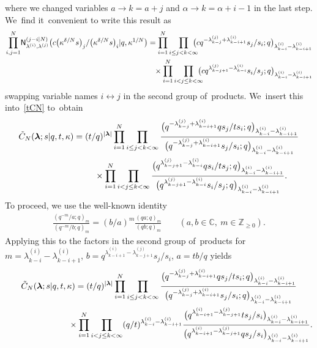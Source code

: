 \documentclass[pdftex]{sigma}%
\numberwithin{equation}{section}
\newcommand{\vlam}{\boldsymbol{\lambda}}
\newcommand{\C}{{\mathbb C}}
\newcommand{\Z}{{\mathbb Z}}
\begin{document}
where we changed variables $a\to k=a+j$ and $\alpha\to k=\alpha+i-1$ in the last step.
We~find it~convenient to write this result as
\begin{gather*}
\prod_{i,j=1}^N \! \mathsf{N}^{(j-i|N)}_{\lambda^{(i)},\lambda^{(j)}}\big(c\big(\kappa^{\delta/N} s\big)_j/\big(\kappa^{\delta/N} s\big)_i|q,\kappa^{1/N}\big)
= \prod_{i=1}^N \prod_{i\leq j<k<\infty} \!\!\!\!\!\big(c q^{-\lambda^{(j)}_{k-j}+\lambda^{(i)}_{k-i+1}}s_{j}/s_i;q\big)_{\lambda^{(i)}_{k-i}-\lambda^{(i)}_{k-i+1}} \\ \hphantom{\prod_{i,j=1}^N \mathsf{N}^{(j-i|N)}_{\lambda^{(i)},\lambda^{(j)}}(c(\kappa^{\delta/N} s)_j/(\kappa^{\delta/N} s)_i|q,\kappa^{1/N})= }
{}\times
\prod_{i=1}^N \prod_{i<j\leq k<\infty} \!\!\! \!\! \big(cq^{\lambda^{(j)}_{k-j+1}-\lambda^{(i)}_{k-i}}s_i/s_{j};q\big)_{\lambda^{(i)}_{k-i}-\lambda^{(i)}_{k-i+1}}
\end{gather*}
swapping variable names $i\leftrightarrow j$ in the second group of~products.
We~insert this into~\eqref{tCN} to~obtain
\begin{gather*}
 \tilde C_N(\vlam;s|q,t,\kappa) = (t/q)^{|\vlam|}\prod_{i=1}^N \prod_{i\leq j<k<\infty} \frac{\big(q^{-\lambda^{(j)}_{k-j}+\lambda^{(i)}_{k-i+1}}qs_{j}/ts_i;q\big)_{\lambda^{(i)}_{k-i}
 -\lambda^{(i)}_{k-i+1}}}{\big(q^{-\lambda^{(j)}_{k-j}+\lambda^{(i)}_{k-i+1}}s_{j}/s_i;q\big)_{\lambda^{(i)}_{k-i}
 -\lambda^{(i)}_{k-i+1}}}
 \\ \hphantom{ \tilde C_N(\vlam;s|q,t,\kappa) =}
{}\times
\prod_{i=1}^N \prod_{i<j\leq k<\infty} \frac{\big(q^{\lambda^{(j)}_{k-j+1}-\lambda^{(i)}_{k-i}}qs_i/ts_{j};q\big)_{\lambda^{(i)}_{k-i}
-\lambda^{(i)}_{k-i+1}}}{\big(q^{\lambda^{(j)}_{k-j+1}-\lambda^{(i)}_{k-i}}s_i/s_{j};q\big)_{\lambda^{(i)}_{k-i}
-\lambda^{(i)}_{k-i+1}}}.
\end{gather*}
To proceed, we use the well-known identity
\begin{gather*}
\frac{(q^{-m}/a;q)_m}{(q^{-m}/b;q)_m} = (b/a)^m\frac{(qa;q)_m}{(qb;q)_m} \qquad
(a,b\in\C,\ m\in\Z_{\geq 0}).
\end{gather*}
Applying this to the factors in the second group of~products for~$m=\lambda^{(i)}_{k-i}-\lambda^{(i)}_{k-i+1}$, $b=q^{\lambda^{(i)}_{k-i+1}-\lambda^{(j)}_{k-j+1}}s_j/s_i$, $a=tb/q$ yields
\begin{gather*}
\tilde C_N(\vlam;s|q,t,\kappa) = (t/q)^{|\vlam|}\prod_{i=1}^N \prod_{i\leq j<k<\infty} \frac{\big(q^{-\lambda^{(j)}_{k-j}+\lambda^{(i)}_{k-i+1}}qs_{j}/ts_i;q\big)_{\lambda^{(i)}_{k-i}
-\lambda^{(i)}_{k-i+1}}}{\big(q^{-\lambda^{(j)}_{k-j}+\lambda^{(i)}_{k-i+1}}s_{j}/s_i;q\big)_{\lambda^{(i)}_{k-i}-\lambda^{(i)}_{k-i+1}}} \\ \hphantom{\tilde C_N(\vlam;s|q,t,\kappa) =}
{}\times
\prod_{i=1}^N \prod_{i<j\leq k<\infty} (q/t)^{\lambda^{(i)}_{k-i}-\lambda^{(i)}_{k-i+1}} \frac{\big(q^{\lambda^{(i)}_{k-i+1}-\lambda^{(j)}_{k-j+1}}ts_j/s_i\big)_{\lambda^{(i)}_{k-i}
-\lambda^{(i)}_{k-i+1}}}{\big(q^{\lambda^{(i)}_{k-i+1}-\lambda^{(j)}_{k-j+1}}qs_j/s_i\big)_{\lambda^{(i)}_{k-i}-\lambda^{(i)}_{k-i+1}}}.
\end{gather*}
\end{document}
